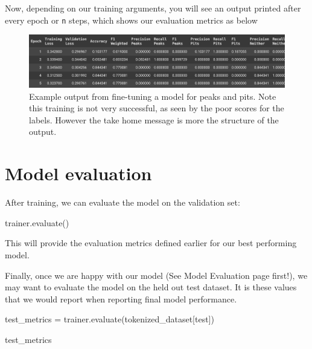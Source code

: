 \documentclass[
  letterpaper,
  DIV=11,
  numbers=noendperiod]{scrreprt}
\newenvironment{Shaded}{\begin{snugshade}}{\end{snugshade}}
\newcommand{\NormalTok}[1]{\textcolor[rgb]{0.00,0.23,0.31}{#1}}
\newcommand{\OperatorTok}[1]{\textcolor[rgb]{0.37,0.37,0.37}{#1}}
\newcommand{\StringTok}[1]{\textcolor[rgb]{0.13,0.47,0.30}{#1}}
\begin{document}
Now, depending on our training arguments, you will see an output printed
after every epoch or \texttt{n} steps, which shows our evaluation
metrics as below

\begin{figure}[H]

{\centering \includegraphics{quarto_docs/../img/model_eval_eg.png}

}

\caption{Example output from fine-tuning a model for peaks and pits.
Note this training is not very successful, as seen by the poor scores
for the labels. However the take home message is more the structure of
the output.}

\end{figure}%

\section{Model evaluation}\label{model-evaluation}

After training, we can evaluate the model on the validation set:

\begin{Shaded}
\begin{Highlighting}[]
\NormalTok{trainer.evaluate()}
\end{Highlighting}
\end{Shaded}

This will provide the evaluation metrics defined earlier for our best
performing model.

Finally, once we are happy with our model (See Model Evaluation page
first!), we may want to evaluate the model on the held out test dataset.
It is these values that we would report when reporting final model
performance.

\begin{Shaded}
\begin{Highlighting}[]
\NormalTok{test\_metrics }\OperatorTok{=}\NormalTok{ trainer.evaluate(tokenized\_dataset[}\StringTok{\textquotesingle{}test\textquotesingle{}}\NormalTok{])}

\NormalTok{test\_metrics}
\end{Highlighting}
\end{Shaded}
\end{document}
